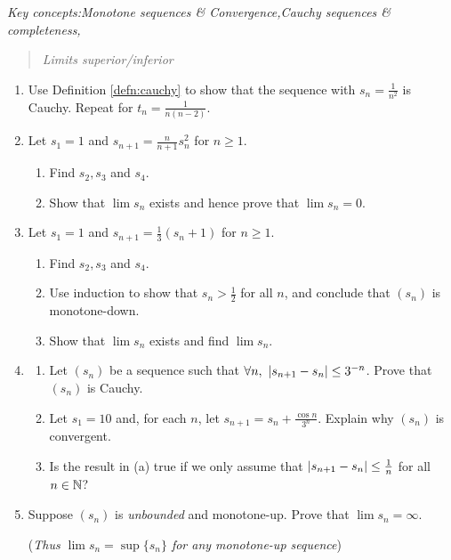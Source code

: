 \begin{exercises}{}{}
	\emph{Key concepts:\quad Monotone sequences \& Convergence,\quad Cauchy sequences \& completeness,}\vspace{-3pt}
	\begin{quote}
		\emph{Limits superior/inferior}
	\end{quote} 

	\begin{enumerate}\itemsep2pt
	  \item Use Definition \ref{defn:cauchy} to show that the sequence with $s_n=\frac 1{n^2}$ is Cauchy. Repeat for $t_n=\frac 1{n(n-2)}$.
	  
	  \item%
	  Let $s_1=1$ and $s_{n+1}=\frac n{n+1}s_n^2$ for $n\ge 1$.
	  \begin{enumerate}
		  \item Find $s_2, s_3$ and $s_4$.
		  \item Show that $\lim s_n$ exists and hence prove that $\lim s_n=0$.
	  \end{enumerate}
	  
	  
	  \item%
	  Let $s_1=1$ and $s_{n+1}=\frac 13(s_n+1)$ for $n\ge 1$.
	  \begin{enumerate}
		  \item Find $s_2, s_3$ and $s_4$.
		  \item Use induction to show that $s_n>\frac 12$ for all $n$, and conclude that $(s_n)$ is monotone-down.
		  \item Show that $\lim s_n$ exists and find $\lim s_n$.
	  \end{enumerate}
	  
	  
	  \item%
	  \begin{enumerate}
	  	\item Let $(s_n)$ be a sequence such that $\forall n,\ \nm{s_{n+1}-s_n}\le 3^{-n}$. Prove that $(s_n)$ is Cauchy.
	  	\item Let $s_1=10$ and, for each $n$, let $s_{n+1}=s_n+\frac{\cos n}{3^n}$. Explain why $(s_n)$ is convergent.
	  	\item Is the result in (a) true if we only assume that $\left| s_{n+1}-s_n\right|\le \frac 1n$ for all $n\in\mathbb{N}$?
	  \end{enumerate}
	  
	    
	  \item\label{exs:unbddmonotone} Suppose $(s_n)$ is \emph{unbounded} and monotone-up. Prove that $\lim s_n=\infty$.\par
	  (\emph{Thus $\lim s_n=\sup\{s_n\}$ for any monotone-up sequence}) 
	  

\end{enumerate}
\end{exercises}
